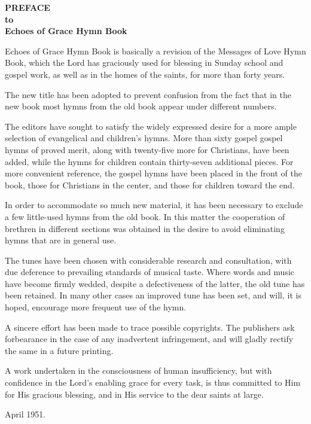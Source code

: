 \documentclass{letter}
\begin{document}
\noindent
{ \center \textbf {PREFACE \\
to \\
Echoes of Grace Hymn Book \\
} }


Echoes of Grace Hymn Book is basically a revision of the Messages of Love Hymn Book, which the Lord has graciously used for blessing in Sunday school and gospel work, as well as in the homes of the saints, for more than forty years.

The new title has been adopted to prevent confusion from the fact that in the new book most hymns from the old book appear under different numbers.

The editors have sought to satisfy the widely expressed desire for a more ample selection of evangelical and children's hymns. More than sixty gospel gospel hymns of proved merit, along with twenty-five more for Christians, have been added, while the hymns for children contain thirty-seven additional pieces. For more convenient reference, the gospel hymns have been placed in the front of the book, those for Christians in the center, and those for children toward the end.

In order to accommodate so much new material, it has been necessary to exclude a few little-used hymns from the old book. In this matter the cooperation of brethren in different sections was obtained in the desire to avoid eliminating hymns that are in general use.

The tunes have been chosen with considerable research and consultation, with due deference to prevailing standards of musical taste. Where words and music have become firmly wedded, despite a defectiveness of the latter, the old tune has been retained. In many other cases an improved tune has been set, and will, it is hoped, encourage more frequent use of the hymn.

A sincere effort has been made to trace possible copyrights. The publishers ask forbearance in the case of any inadvertent infringement, and will gladly rectify the same in a future printing.

A work undertaken in the consciousness of human insufficiency, but with confidence in the Lord's enabling grace for every task, is thus committed to Him for His gracious blessing, and in His service to the dear saints at large.

\noindent
April 1951.
\end{document}
